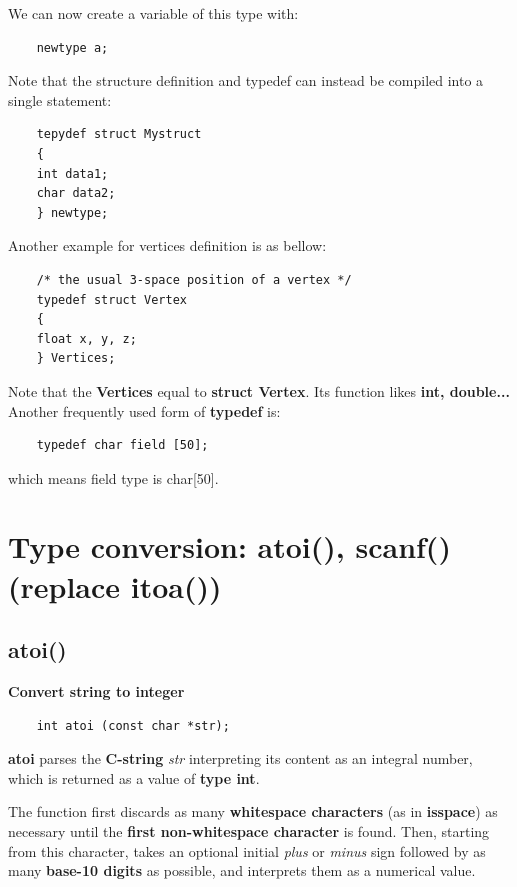 	We can now create a variable of this type with:
	\begin{verbatim}
	newtype a;
	\end{verbatim}
	
	Note that the structure definition and typedef can instead be compiled into a single statement:
	\begin{verbatim}
	tepydef struct Mystruct
	{
	int data1;
	char data2;
	} newtype;
	\end{verbatim}
	
	Another example for vertices definition is as bellow:
	\begin{verbatim}
	/* the usual 3-space position of a vertex */
	typedef struct Vertex 
	{
	float x, y, z;             
	} Vertices;
	\end{verbatim}
	
	Note that the \textbf{Vertices} equal to \textbf{struct Vertex}. Its function likes \textbf{int, double...} \\
	
	Another frequently used form of \textbf{typedef} is:
	\begin{verbatim}
	typedef char field [50];
	\end{verbatim}
	
	which means field type is char[50].	

	\section{Type conversion: atoi(), scanf() (replace itoa())}
	\subsection{atoi()}
	\textbf{Convert string to integer}
	
	\begin{verbatim}
	int atoi (const char *str);
	\end{verbatim}
	
	\textbf{atoi} parses the \textbf{C-string} \textit{str} interpreting its content as an integral number, which is returned as a value of \textbf{type int}.
	
	The function first discards as many \textbf{whitespace characters} (as in \textbf{isspace}) as necessary until the \textbf{first non-whitespace character} is found. Then, starting from this character, takes an optional initial \textit{plus} or \textit{minus} sign followed by as many \textbf{base-10 digits} as possible, and interprets them as a numerical value.\\
	
